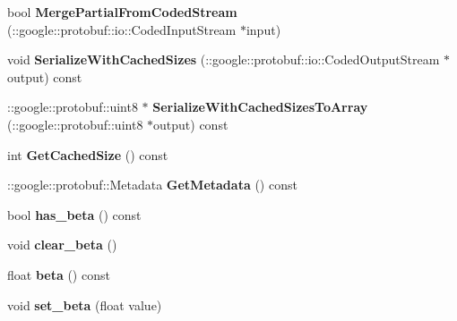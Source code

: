 \begin{DoxyCompactItemize}
bool {\bfseries Merge\+Partial\+From\+Coded\+Stream} (\+::google\+::protobuf\+::io\+::\+Coded\+Input\+Stream $\ast$input)
\item 
\mbox{\label{classcaffe_1_1_swish_parameter_aff36cbcf2fbfa47e6ae19659a2e76002}} 
void {\bfseries Serialize\+With\+Cached\+Sizes} (\+::google\+::protobuf\+::io\+::\+Coded\+Output\+Stream $\ast$output) const
\item 
\mbox{\label{classcaffe_1_1_swish_parameter_a44cf97e6639730259bd60eb13fa9f9d9}} 
\+::google\+::protobuf\+::uint8 $\ast$ {\bfseries Serialize\+With\+Cached\+Sizes\+To\+Array} (\+::google\+::protobuf\+::uint8 $\ast$output) const
\item 
\mbox{\label{classcaffe_1_1_swish_parameter_af06c5cfc15e76061d099dba9d3fac1fd}} 
int {\bfseries Get\+Cached\+Size} () const
\item 
\mbox{\label{classcaffe_1_1_swish_parameter_aa724491e555007c46f7fd6e1e246f989}} 
\+::google\+::protobuf\+::\+Metadata {\bfseries Get\+Metadata} () const
\item 
\mbox{\label{classcaffe_1_1_swish_parameter_a647a575cc13cd5bef7002afd602fea7e}} 
bool {\bfseries has\+\_\+beta} () const
\item 
\mbox{\label{classcaffe_1_1_swish_parameter_a9bf228e804bf95188881c3274a4b8417}} 
void {\bfseries clear\+\_\+beta} ()
\item 
\mbox{\label{classcaffe_1_1_swish_parameter_af5f916af9c8855a14fb852bdc0ff2895}} 
float {\bfseries beta} () const
\item 
\mbox{\label{classcaffe_1_1_swish_parameter_ac1b090548ba9e60da213de3cf0e4a972}} 
void {\bfseries set\+\_\+beta} (float value)
\end{DoxyCompactItemize}
